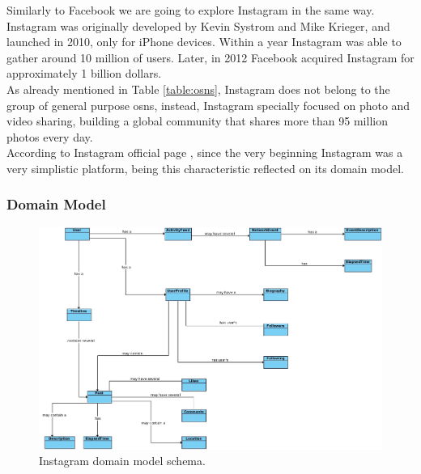 Similarly to Facebook we are going to explore Instagram in the same way. Instagram was originally developed by Kevin Systrom and Mike Krieger, and launched in 2010, only
for iPhone devices. Within a year Instagram was able to gather around 10 million of users. Later, in 2012 Facebook acquired Instagram for approximately 1 billion dollars.\\
\indent As already mentioned in Table \ref{table:osns}, Instagram does not belong to the group of general purpose \glspl{osn}, instead, Instagram specially focused on photo and video sharing, building a global community that shares more than 95 million photos every day.\\
\indent According to Instagram official page \footnotemark[9], since
the very beginning Instagram was a very simplistic platform, being this characteristic reflected on its domain model.

\subsubsection*{Domain Model}

\begin{figure}[h!]
  \hspace*{-1in}
  \includegraphics[width=1.28\textwidth]{img/instagram-domain-model.jpg}
\caption{\label{img:instadomain} Instagram domain model schema.}
\end{figure}

